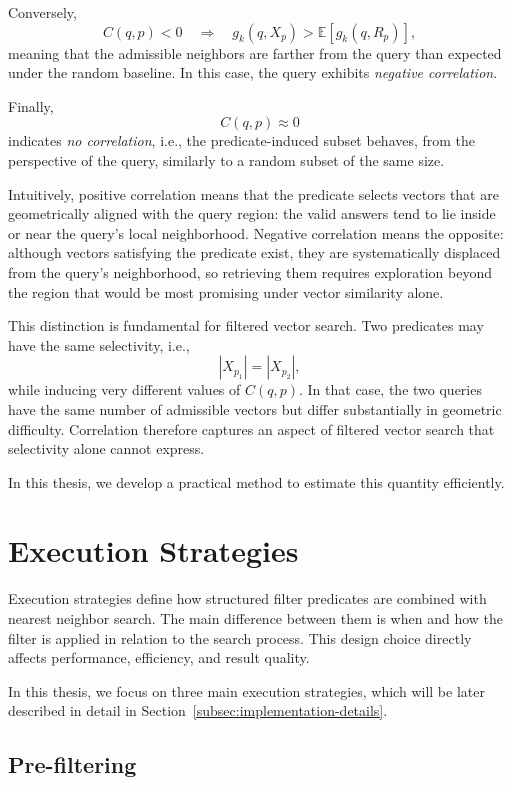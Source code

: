 Conversely,
\[
C(q,p) < 0 \quad \Longrightarrow \quad g_k(q,X_p) > \mathbb{E}[g_k(q,R_p)],
\]
meaning that the admissible neighbors are farther from the query than expected under the random baseline. In this case, the query exhibits \emph{negative correlation}.

Finally,
\[
C(q,p) \approx 0
\]
indicates \emph{no correlation}, i.e., the predicate-induced subset behaves, from the perspective of the query, similarly to a random subset of the same size.

Intuitively, positive correlation means that the predicate selects vectors that are geometrically aligned with the query region: the valid answers tend to lie inside or near the query's local neighborhood. Negative correlation means the opposite: although vectors satisfying the predicate exist, they are systematically displaced from the query's neighborhood, so retrieving them requires exploration beyond the region that would be most promising under vector similarity alone.

This distinction is fundamental for filtered vector search. Two predicates may have the same selectivity, i.e.,
\[
|X_{p_1}| = |X_{p_2}|,
\]
while inducing very different values of \(C(q,p)\). In that case, the two queries have the same number of admissible vectors but differ substantially in geometric difficulty. Correlation therefore captures an aspect of filtered vector search that selectivity alone cannot express.

In this thesis, we develop a practical method to estimate this quantity efficiently.

\section{Execution Strategies}\label{sec:execution-strategies}

Execution strategies define how structured filter predicates are combined with nearest neighbor search. The main difference between them is when and how the filter is applied in relation to the search process. This design choice directly affects performance, efficiency, and result quality.

In this thesis, we focus on three main execution strategies, which will be later described in detail in Section~\ref{subsec:implementation-details}.

\subsection{Pre-filtering}\label{sec:pre-filtering}

